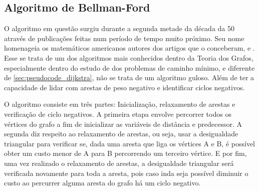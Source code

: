 \subsection{Algoritmo de Bellman-Ford}
\label{sec:pseudocode_bellmanford}
O algoritmo em questão surgiu durante a segunda metade da década da 50
através de publicações feitas num período de tempo muito próximo. Seu nome
homenageia os matemáticos americanos autores dos artigos que o conceberam,
\cite{bellmanaarticle} e \cite{fordarticle}. Esse se trata de um dos algoritmos
mais conhecidos dentro da Teoria dos Grafos, especialmente dentro do estudo de
dos problemas de caminho mínimo, e diferente de
\ref{sec:pseudocode_dijkstra}, não
se trata de um algoritmo guloso. Além de ter a capacidade de lidar
com arestas de
peso negativo e identificar ciclos negativos.

\begin{algorithm}
  \caption{Algoritmo de Bellman-Ford}
  \begin{algorithmic}[0]
    \Statex
     
    \EndFor
    \For{$i \in [1,n)$}
     
    \EndIf
    \EndFor
    \EndFor
     
    \EndIf
    \EndFor
    \State {}
    \EndFunction
  \end{algorithmic}
\end{algorithm}
\FloatBarrier

O algoritmo consiste em três partes: Inicialização, relaxamento de arestas e
verificação de ciclo negativos. A primeira etapa envolve percorrer todos os
vértices do grafo a fim de inicializar as variáveis de distância e predecessor.
A segunda diz respeito ao relaxamento de arestas, ou seja, usar a desigualdade
triangular para verificar se, dada uma aresta que liga os vértices A
e B, é possível
obter um custo menor de A para B percorrendo um terceiro vértice. E por fim, uma
vez realizado o relaxamento de arestas, a desigualdade triangular
será verificada
novamente para toda a aresta, pois caso inda seja possível diminuir o custo ao
percurrer alguma aresta do grafo há um ciclo negativo.

